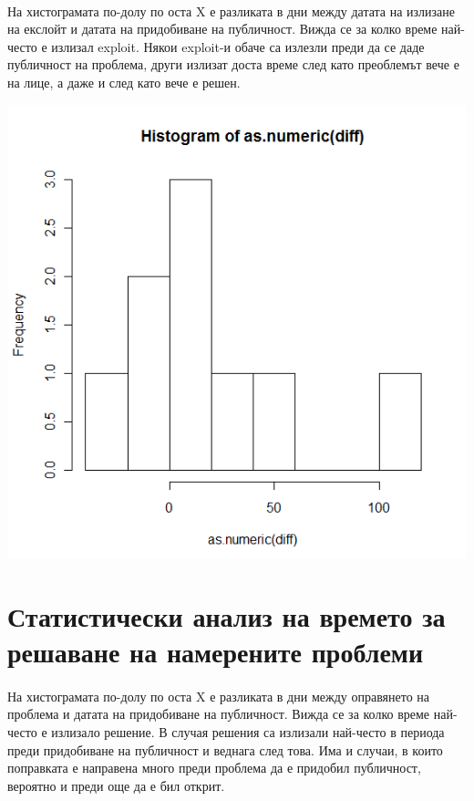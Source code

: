 \documentclass[a4paper,12pt,leqno]{article}
\begin{document}
\paragraph{}
На хистограмата по-долу по оста X е разликата в дни между датата на излизане на екслойт и датата на придобиване на публичност. Вижда се за колко време най-често е излизал exploit. Някои exploit-и обаче са излезли преди да се даде публичност на проблема, други излизат доста време след като преоблемът вече е на лице, а даже и след като вече е решен.

\includegraphics{time_for_exploit}

\newpage
\section{Статистически анализ на времето за решаване на намерените проблеми}
\paragraph{}
На хистограмата по-долу по оста X е разликата в дни между оправянето на проблема и датата на придобиване на публичност. Вижда се за колко време най-често е излизало решение. В случая решения са излизали най-често в периода преди придобиване на публичност и веднага след това. Има и случаи, в които поправката е направена много преди проблема да е придобил публичност, вероятно и преди още да е бил открит.
\end{document}
